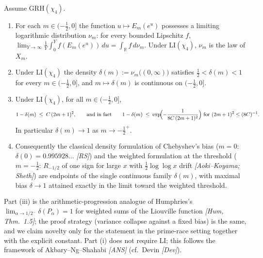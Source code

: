 \begin{theorem}\label{thm:interp}
Assume GRH$(\chi_4)$.
\begin{enumerate}
\item[(i)] For each $m\in(-\tfrac12,0]$ the function
$u\mapsto E_m(e^u)$ possesses a limiting logarithmic distribution
$\nu_m$: for every bounded Lipschitz $f$,
$\lim_{Y\to\infty}\frac1Y\int_0^Y f(E_m(e^u))\,du
=\int_{\mathbb R}f\,d\nu_m$. Under LI$(\chi_4)$, $\nu_m$ is the law of
$X_m$.
\item[(ii)] Under LI$(\chi_4)$ the density
$\delta(m):=\nu_m\bigl((0,\infty)\bigr)$ satisfies
$\tfrac12<\delta(m)<1$ for every $m\in(-\tfrac12,0]$, and
$m\mapsto\delta(m)$ is continuous on $(-\tfrac12,0]$.
\item[(iii)] Under LI$(\chi_4)$, for all $m\in(-\tfrac12,0]$,
\[
1-\delta(m)\;\le\;C\,(2m+1)^2 ,
\qquad\text{and in fact}\qquad
1-\delta(m)\;\le\;\exp\!\Bigl(-\frac{1}{8C\,(2m+1)^2}\Bigr)
\ \text{for }(2m+1)^2\le(8C)^{-1}.
\]
In particular $\delta(m)\to1$ as $m\to-\tfrac12^+$.
\item[(iv)] Consequently the classical density formulation of
Chebyshev's bias ($m=0$: $\delta(0)=0.995928\ldots$
\emph{[RS]}) and the weighted formulation at the threshold
($m=-\tfrac12$: $R_{-1/2}$ of one sign for large $x$ with
$\tfrac12\log\log x$ drift \emph{[Aoki--Koyama; Sheth]}) are endpoints
of the single continuous family $\delta(m)$, with maximal bias
$\delta\to1$ attained exactly in the limit toward the weighted
threshold.
\end{enumerate}
\end{theorem}

\begin{remark}
Part (iii) is the arithmetic-progression analogue of Humphries's
$\lim_{\alpha\to1/2^-}\delta(P_\alpha)=1$ for weighted sums of the
Liouville function \emph{[Hum, Thm.~1.5]}; the proof strategy
(variance collapse against a fixed bias) is the same, and we claim
novelty only for the statement in the prime-race setting together with
the explicit constant. Part (i) does not require LI; this follows the
framework of Akbary--Ng--Shahabi \emph{[ANS]} (cf.\ Devin \emph{[Dev]}).
\end{remark}

